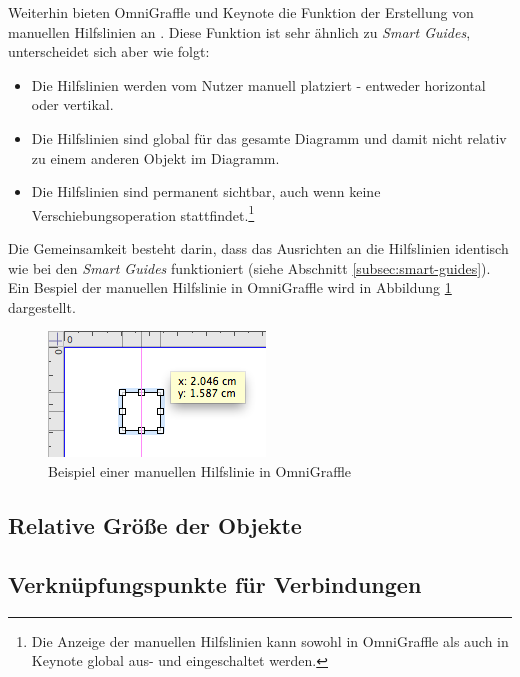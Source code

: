 Weiterhin bieten OmniGraffle und Keynote die Funktion der Erstellung von manuellen Hilfslinien an \cite{08OmniGraffle, 11Keynote}. Diese Funktion ist sehr ähnlich zu \textit{Smart Guides}, unterscheidet sich aber wie folgt:

\begin{itemize}
    \item Die Hilfslinien werden vom Nutzer manuell platziert - entweder horizontal oder vertikal.
    \item Die Hilfslinien sind global für das gesamte Diagramm und damit nicht relativ zu einem anderen Objekt im Diagramm.
    \item Die Hilfslinien sind permanent sichtbar, auch wenn keine Verschiebungsoperation stattfindet.\footnote{Die Anzeige der manuellen Hilfslinien kann sowohl in OmniGraffle als auch in Keynote global aus- und eingeschaltet werden.}
\end{itemize}

Die Gemeinsamkeit besteht darin, dass das Ausrichten an die Hilfslinien identisch wie bei den \textit{Smart Guides} funktioniert (siehe Abschnitt \ref{subsec:smart-guides}). Ein Bespiel der manuellen Hilfslinie in OmniGraffle wird in Abbildung \ref{fig:omnigraffle-manual-guides} dargestellt.

\begin{figure}[hbt]
    \centering
    \includegraphics{resources/omnigraffle-manual-guides.png}
    \caption{Beispiel einer manuellen Hilfslinie in OmniGraffle}
    \label{fig:omnigraffle-manual-guides}
\end{figure}

\subsection{Relative Größe der Objekte}


\subsection{Verknüpfungspunkte für Verbindungen}


